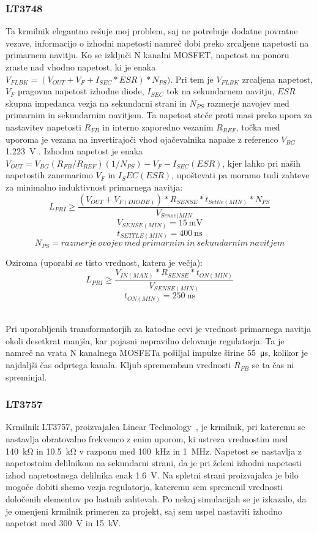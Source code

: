 \documentclass[a4paper,twoside,openright,12pt,Slovene]{book}
\begin{document}
	\subsubsection{LT3748} \label{LT3748}
Ta krmilnik elegantno rešuje moj problem, saj ne potrebuje dodatne povratne vezave, informacijo o izhodni napetosti namreč dobi preko zrcaljene napetosti na primarnem navitju. Ko se izključi N kanalni MOSFET, napetost na ponoru zraste nad vhodno napetost, ki je enaka \(V_{FLBK} = (V_{OUT} + V_F + I_{SEC} * ESR) * N_{PS}) \). Pri tem je \(V_{FLBK}\) zrcaljena napetost, \(V_F\) pragovna napetost izhodne diode, \(I_{SEC}\) tok na sekundarnem navitju, \(ESR\) skupna impedanca vezja na sekundarni strani in \(N_{PS}\) razmerje navojev med primarnim in sekundarnim navitjem. Ta napetost steče proti masi preko upora za nastavitev napetosti \(R_{FB}\) in interno zaporedno vezanim \(R_{REF}\), točka med uporoma je vezana na invertirajoči vhod ojačevalnika napake z referenco \(V_{BG}\) \SI{1,223}{\volt} \cite{analog:LT3748}. Izhodna napetost je enaka \(V_{OUT} = V_{BG}(R_{FB} / R_{REF})(1 / N_{PS}) - V_F - I_{SEC} (ESR)\), kjer lahko pri naših napetostih zanemarimo \(V_F\) in \(I_SEC (ESR)\), upoštevati pa moramo tudi zahteve za minimalno induktivnost primarnega navitja:
\[L_{PRI} \geq \frac{(V_{OUT}+V_{F(DIODE)}) * R_{SENSE} * t_{Settle(MIN)} * N_{PS}}{V_{Sense(MIN}}\]
\[V_{SENSE(MIN)}=\SI{15}{\milli\volt}\]
\[t_{SETTLE(MIN)}=\SI{400}{\nano\second}\]
\[N_{PS}=razmerje \: ovojev \: med \: primarnim \: in \: sekundarnim \: navitjem \]

Oziroma (uporabi se tisto vrednost, katera je večja):
\[L_{PRI} \geq \frac{V_{IN(MAX)}*R_{SENSE}*t_{ON(MIN)}}{V_{SENSE(MIN)}}\]
\[t_{ON(MIN)}=\SI{250}{\nano\second}\]

~\\Pri uporabljenih transformatorjih za katodne cevi je vrednost primarnega navitja okoli desetkrat manjša, kar pojasni nepravilno delovanje regulatorja. Ta je namreč na vrata N kanalnega MOSFETa pošiljal impulze širine \SI{55}{\micro\second}, kolikor je najdaljši čas odprtega kanala. Kljub spremembam vrednosti \(R_{FB}\) se ta čas ni spreminjal.

	\subsubsection{LT3757} \label{LT3757}
Krmilnik LT3757, proizvajalca Linear Technology~\cite{analog:LT3757}, je krmilnik, pri kateremu se nastavlja obratovalno frekvenco z enim uporom, ki ustreza vrednostim med \SI{140}{\kilo\ohm} in \SI{10.5}{\kilo\ohm} v razponu med \SI{100} {\kilo\hertz} in \SI{1} {\mega\hertz}. Napetost se nastavlja z napetostnim delilnikom na sekundarni strani, da je pri želeni izhodni napetosti izhod napetostnega delilnika enak \SI{1,6} {\volt}. Na spletni strani proizvajalca je bilo mogoče dobiti shemo vezja regulatorja, kateremu sem spremenil vrednosti določenih elementov po lastnih zahtevah. Po nekaj simulacijah se je izkazalo, da je omenjeni krmilnik primeren za projekt, saj sem uspel nastaviti izhodno napetost med \SI{300}{\volt} in \SI{15}{\kilo\volt}. 
\end{document}
